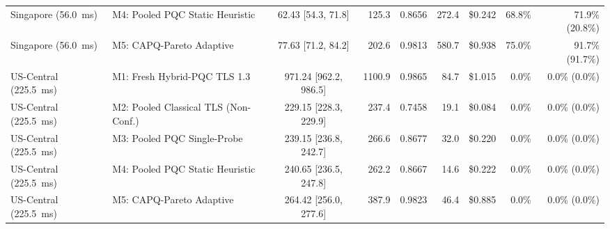 \documentclass[10pt,journal,compsoc]{IEEEtran}
\begin{document}
\begin{table}[!t]
\begin{adjustbox}{max width=\textwidth}
\begin{tabular}{llcrrrrrr}
Singapore (56.0~ms) & M4: Pooled PQC Static Heuristic & 62.43 [54.3, 71.8] & 125.3 & 0.8656 & 272.4 & \$0.242 & 68.8\% & 71.9\% (20.8\%) \\
Singapore (56.0~ms) & M5: CAPQ-Pareto Adaptive & 77.63 [71.2, 84.2] & 202.6 & 0.9813 & 580.7 & \$0.938 & 75.0\% & 91.7\% (91.7\%) \\
\midrule
US-Central (225.5~ms) & M1: Fresh Hybrid-PQC TLS 1.3 & 971.24 [962.2, 986.5] & 1100.9 & 0.9865 & 84.7 & \$1.015 & 0.0\% & 0.0\% (0.0\%) \\
US-Central (225.5~ms) & M2: Pooled Classical TLS (Non-Conf.) & 229.15 [228.3, 229.9] & 237.4 & 0.7458 & 19.1 & \$0.084 & 0.0\% & 0.0\% (0.0\%) \\
US-Central (225.5~ms) & M3: Pooled PQC Single-Probe & 239.15 [236.8, 242.7] & 266.6 & 0.8677 & 32.0 & \$0.220 & 0.0\% & 0.0\% (0.0\%) \\
US-Central (225.5~ms) & M4: Pooled PQC Static Heuristic & 240.65 [236.5, 247.8] & 262.2 & 0.8667 & 14.6 & \$0.222 & 0.0\% & 0.0\% (0.0\%) \\
US-Central (225.5~ms) & M5: CAPQ-Pareto Adaptive & 264.42 [256.0, 277.6] & 387.9 & 0.9823 & 46.4 & \$0.885 & 0.0\% & 0.0\% (0.0\%) \\
\bottomrule
\end{tabular}
\end{adjustbox}
\end{table}
\end{document}

